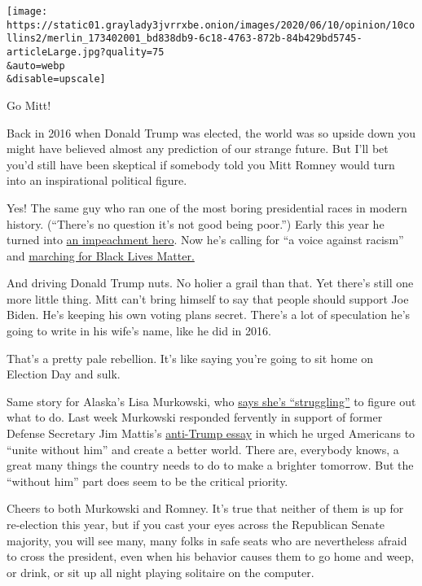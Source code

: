 \texttt{[image: https://static01.graylady3jvrrxbe.onion/images/2020/06/10/opinion/10collins2/merlin\_173402001\_bd838db9-6c18-4763-872b-84b429bd5745-articleLarge.jpg?quality=75\\\&auto=webp\\\&disable=upscale]}

Go Mitt!

Back in 2016 when Donald Trump was elected, the world was so upside down
you might have believed almost any prediction of our strange future. But
I'll bet you'd still have been skeptical if somebody told you Mitt
Romney would turn into an inspirational political figure.

Yes! The same guy who ran one of the most boring presidential races in
modern history. (``There's no question it's not good being poor.'')
Early this year he turned into
\href{https://www.nytimes3xbfgragh.onion/2020/02/05/us/politics/romney-trump-impeachment.html}{an
impeachment hero}. Now he's calling for ``a voice against racism'' and
\href{https://www.nytimes3xbfgragh.onion/2020/06/07/us/politics/mitt-romney-george-floyd-protests.html}{marching
for Black Lives Matter.}

And driving Donald Trump nuts. No holier a grail than that. Yet there's
still one more little thing. Mitt can't bring himself to say that people
should support Joe Biden. He's keeping his own voting plans secret.
There's a lot of speculation he's going to write in his wife's name,
like he did in 2016.

That's a pretty pale rebellion. It's like saying you're going to sit
home on Election Day and sulk.

Same story for Alaska's Lisa Murkowski, who
\href{https://www.nytimes3xbfgragh.onion/2020/06/04/us/politics/murkowski-mattis-trump.html}{says
she's ``struggling''} to figure out what to do. Last week Murkowski
responded fervently in support of former Defense Secretary Jim Mattis's
\href{https://www.theatlantic.com/politics/archive/2020/06/james-mattis-denounces-trump-protests-militarization/612640/}{anti-Trump
essay} in which he urged Americans to ``unite without him'' and create a
better world. There are, everybody knows, a great many things the
country needs to do to make a brighter tomorrow. But the ``without him''
part does seem to be the critical priority.

Cheers to both Murkowski and Romney. It's true that neither of them is
up for re-election this year, but if you cast your eyes across the
Republican Senate majority, you will see many, many folks in safe seats
who are nevertheless afraid to cross the president, even when his
behavior causes them to go home and weep, or drink, or sit up all night
playing solitaire on the computer.

